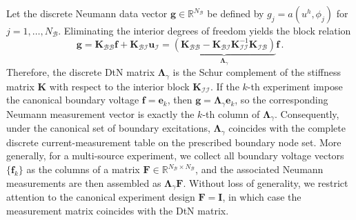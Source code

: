 \documentclass{article}
\begin{document}
Let the discrete Neumann data vector $\mathbf{g} \in \mathbb{R}^{N_{\mathcal{B}}}$ be defined by $g_j = a(u^h, \phi_j)$ for $j = 1, \dots, N_\mathcal{B}$. Eliminating the interior degrees of freedom yields the block relation
\begin{equation}
\label{eq:g_lambda}
\mathbf{g}=\mathbf{K}_{\mathcal{B B}}\mathbf{f}+ \mathbf{K}_{\mathcal{BI}} \mathbf{u}_{\mathcal{I}}=\underbrace{\left(\mathbf{K}_{\mathcal{B B}}-\mathbf{K}_{\mathcal{BI}} \mathbf{K}_{\mathcal{II}}^{-1} \mathbf{K}_{\mathcal{I B}}\right)}_{\mathbf{\Lambda}_\gamma} \mathbf{f} \,.  
\end{equation}
Therefore, the discrete DtN matrix $\mathbf{\Lambda}_{\gamma}$ is the Schur complement of the stiffness matrix $\mathbf{K}$ with respect to the interior block $\mathbf{K}_{\mathcal{II}}$. If the $k$-th experiment impose the canonical boundary voltage $\mathbf{f} = \mathbf{e}_k$, then $\mathbf{g} = \mathbf{\Lambda}_\gamma \mathbf{e}_k$, so the corresponding Neumann measurement vector is exactly the $k$-th column of $\mathbf{\Lambda}_\gamma$. 
Consequently, under the canonical set of boundary excitations, $\mathbf{\Lambda}_\gamma$ coincides with the complete discrete current-measurement table on the prescribed boundary node set. 
More generally, for a multi-source experiment, we collect all boundary voltage vectors $\{\mathbf{f}_k\}$ as the columns of a matrix $\mathbf{F} \in \mathbb{R}^{N_\mathcal{B}\times N_\mathcal{B}}$, and the associated Neumann measurements are then assembled as $\mathbf{\Lambda}_\gamma \mathbf{F}$. Without loss of generality, we restrict attention to the canonical experiment design $\mathbf{F} = \mathbf{I}$, in which case the measurement matrix coincides with the DtN matrix.
\end{document}
